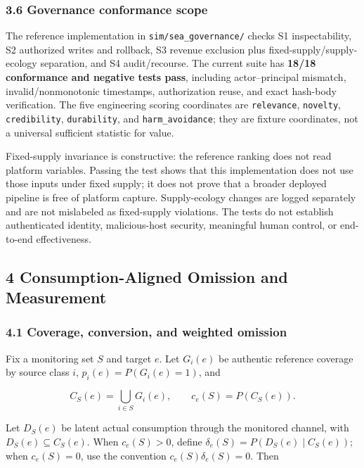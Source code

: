 \documentclass[
  11pt]{article}
\begin{document}
\subsubsection{3.6 Governance conformance
scope}\label{governance-conformance-scope}

The reference implementation in \texttt{sim/sea\_governance/} checks S1
inspectability, S2 authorized writes and rollback, S3 revenue exclusion
plus fixed-supply/supply-ecology separation, and S4 audit/recourse. The
current suite has \textbf{18/18 conformance and negative tests pass},
including actor--principal mismatch, invalid/nonmonotonic timestamps,
authorization reuse, and exact hash-body verification. The five
engineering scoring coordinates are \texttt{relevance},
\texttt{novelty}, \texttt{credibility}, \texttt{durability}, and
\texttt{harm\_avoidance}; they are fixture coordinates, not a universal
sufficient statistic for value.

Fixed-supply invariance is constructive: the reference ranking does not
read platform variables. Passing the test shows that this implementation
does not use those inputs under fixed supply; it does not prove that a
broader deployed pipeline is free of platform capture. Supply-ecology
changes are logged separately and are not mislabeled as fixed-supply
violations. The tests do not establish authenticated identity,
malicious-host security, meaningful human control, or end-to-end
effectiveness.

\subsection{4 Consumption-Aligned Omission and
Measurement}\label{consumption-aligned-omission-and-measurement}

\subsubsection{4.1 Coverage, conversion, and weighted
omission}\label{coverage-conversion-and-weighted-omission}

Fix a monitoring set \(S\) and target \(e\). Let \(G_i(e)\) be authentic
reference coverage by source class \(i\), \(p_i(e)=P(G_i(e)=1)\), and

\[C_S(e)=\bigcup_{i\in S}G_i(e),\qquad c_e(S)=P(C_S(e)).\]

Let \(D_S(e)\) be latent actual consumption through the monitored
channel, with \(D_S(e)\subseteq C_S(e)\). When \(c_e(S)>0\), define
\(\delta_e(S)=P(D_S(e)\mid C_S(e))\); when \(c_e(S)=0\), use the
convention \(c_e(S)\delta_e(S)=0\). Then
\end{document}
